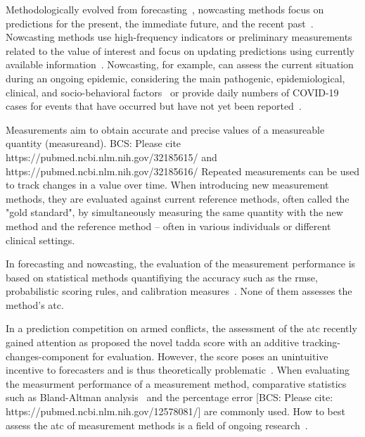 \documentclass[pdflatex]{sn-jnl}
\theoremstyle{plain}%
\theoremstyle{definition}
\begin{document}
Methodologically evolved from forecasting~\citep{Browning1989}, nowcasting methods focus on predictions for the present, the immediate future, and the recent past~\citep{Banbura2013, WorldMeteorologicalOrganizationWMO2017}.
Nowcasting methods use high-frequency indicators or preliminary measurements related to the value of interest and focus on updating predictions using currently available information~\citep{Castle2017}.
Nowcasting, for example, can assess the current situation during an ongoing epidemic, considering the main pathogenic, epidemiological, clinical, and socio-behavioral factors~\citep{Wu2021} or provide daily numbers of COVID-19 cases for events that have occurred but have not yet been reported~\citep{Gunther2021, Wolffram2023}.

Measurements aim to obtain accurate and precise values of a measureable quantity (measureand).
BCS: Please cite https://pubmed.ncbi.nlm.nih.gov/32185615/ and https://pubmed.ncbi.nlm.nih.gov/32185616/
Repeated measurements can be used to track changes in a value over time.  
When introducing new measurement methods, they are evaluated against current reference methods, often called the "gold standard", by simultaneously measuring the same quantity with the new method and the reference method – often in various individuals or different clinical settings.

In forecasting and nowcasting, the evaluation of the measurement performance is based on statistical methods quantifiying the accuracy such as the \ac{rmse}, probabilistic scoring rules, and calibration measures~\citep{Gneiting2007, Gunther2021, Wolffram2023}.
None of them assesses the method's \ac{atc}.

In a prediction competition on armed conflicts, the assessment of the \ac{atc} recently gained attention as \citet{Vesco2022} proposed the novel \ac{tadda} score with an additive tracking-changes-component for evaluation.
However, the score poses an unintuitive incentive to forecasters and is thus theoretically problematic~\parencite{Bracher2023}.
When evaluating the measurment performance of a measurement method, comparative statistics such as Bland-Altman analysis~\citep{Bland1986} and the percentage error [BCS: Please cite: https://pubmed.ncbi.nlm.nih.gov/12578081/] are commonly used.
How to best assess the \ac{atc} of measurement methods is a field of ongoing research~\citep{Saugel2015, Saugel2018, Hiraishi2021}.
\end{document}
